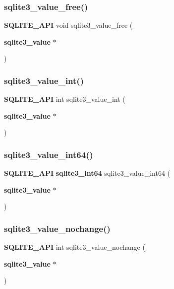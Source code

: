 \mbox{\label{sqlite3_8h_a74e4f2320e2c11ae2fcddac858fdda5e}} 
\subsubsection{sqlite3\_value\_free()}
{\footnotesize\ttfamily \textbf{ S\+Q\+L\+I\+T\+E\+\_\+\+A\+PI} void sqlite3\+\_\+value\+\_\+free (\begin{DoxyParamCaption}\item[{\textbf{ sqlite3\+\_\+value} $\ast$}]{ }\end{DoxyParamCaption})}

\mbox{\label{sqlite3_8h_a5c6adf98772a341f3df5ccd5ff003245}} 
\subsubsection{sqlite3\_value\_int()}
{\footnotesize\ttfamily \textbf{ S\+Q\+L\+I\+T\+E\+\_\+\+A\+PI} int sqlite3\+\_\+value\+\_\+int (\begin{DoxyParamCaption}\item[{\textbf{ sqlite3\+\_\+value} $\ast$}]{ }\end{DoxyParamCaption})}

\mbox{\label{sqlite3_8h_ab56c9a28c7607de9b00c75b27b8fadb1}} 
\subsubsection{sqlite3\_value\_int64()}
{\footnotesize\ttfamily \textbf{ S\+Q\+L\+I\+T\+E\+\_\+\+A\+PI} \textbf{ sqlite3\+\_\+int64} sqlite3\+\_\+value\+\_\+int64 (\begin{DoxyParamCaption}\item[{\textbf{ sqlite3\+\_\+value} $\ast$}]{ }\end{DoxyParamCaption})}

\mbox{\label{sqlite3_8h_adabf96d19ed399177ac6ce784bd7112f}} 
\subsubsection{sqlite3\_value\_nochange()}
{\footnotesize\ttfamily \textbf{ S\+Q\+L\+I\+T\+E\+\_\+\+A\+PI} int sqlite3\+\_\+value\+\_\+nochange (\begin{DoxyParamCaption}\item[{\textbf{ sqlite3\+\_\+value} $\ast$}]{ }\end{DoxyParamCaption})}

